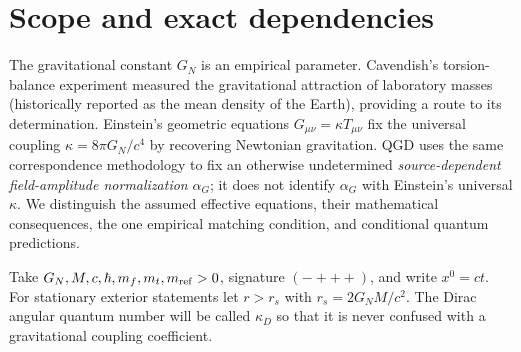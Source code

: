 \documentclass[11pt,a4paper]{article}
\theoremstyle{remark}
\begin{document}
\section{Scope and exact dependencies}\label{sec:scope}
The gravitational constant $G_N$ is an empirical parameter. Cavendish's
torsion-balance experiment measured the gravitational attraction of laboratory
masses (historically reported as the mean density of the Earth), providing a
route to its determination. Einstein's geometric equations
$G_{\mu\nu}=\kappa T_{\mu\nu}$ fix the universal coupling
$\kappa=8\pi G_N/c^4$ by recovering Newtonian gravitation.
QGD uses the same correspondence methodology to fix an otherwise undetermined
\emph{source-dependent field-amplitude normalization} $\alpha_G$; it does not
identify $\alpha_G$ with Einstein's universal $\kappa$. We distinguish the
assumed effective equations, their mathematical consequences, the one
empirical matching condition, and conditional quantum predictions.

Take $G_N,M,c,\hbar,m_f,m_t,m_{\rm ref}>0$, signature $(-+++)$, and write $x^0=ct$. For stationary exterior statements let $r>r_s$ with $r_s=2G_NM/c^2$. The Dirac angular quantum number will be called $\kappa_D$ so that it is never confused with a gravitational coupling coefficient.
\end{document}
